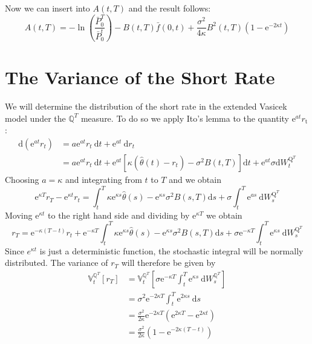 \documentclass[12pt,twoside]{reedthesis}
\begin{document}
Now we can insert into \(A(t, T)\) and the result follows:
\[
A(t, T)=-\ln \left(\frac{\bar{P}_{0}^{T}}{\bar{P}_{0}^{t}}\right)-B(t, T) \bar{f}(0, t)+\frac{\sigma^{2}}{4 \kappa} B^{2}(t, T)\left(1-\mathrm{e}^{-2 \kappa t}\right)
\]

\hypertarget{the-variance-of-the-short-rate}{%
\section{The Variance of the Short Rate}\label{the-variance-of-the-short-rate}}

We will determine the distribution of the short rate in the extended Vasicek model under the \(\mathbb{Q}^{T}\) measure. To do so we apply Ito's lemma to the quantity \(\mathrm{e}^{a t} r_{\mathrm{t}}\) :
\[
\begin{aligned}
\mathrm{d}\left(\mathrm{e}^{a t} r_{t}\right) &=a \mathrm{e}^{a t} r_{t} \mathrm{~d} t+\mathrm{e}^{a t} \mathrm{~d} r_{t} \\
&=a \mathrm{e}^{a t} r_{t} \mathrm{~d} t+\mathrm{e}^{a t}\left[\kappa\left(\hat{\theta}(t)-r_{t}\right)-\sigma^{2} B(t, T)\right] \mathrm{d} t+\mathrm{e}^{a t} \sigma \mathrm{d} W_{t}^{\mathrm{Q}^{T}}
\end{aligned}
\]
Choosing \(a=\kappa\) and integrating from \(t\) to \(T\) and we obtain
\[
\mathrm{e}^{\kappa T} r_{T}-\mathrm{e}^{\kappa t} r_{t}=\int_{t}^{T} \kappa \mathrm{e}^{\kappa s} \hat{\theta}(s)-\mathrm{e}^{\kappa s} \sigma^{2} B(s, T) \mathrm{d} s+\sigma \int_{t}^{T} \mathrm{e}^{a s} \mathrm{~d} W_{s}^{\mathrm{Q}^{T}}
\]
Moving \(\mathrm{e}^{\kappa t}\) to the right hand side and dividing by \(\mathrm{e}^{\kappa T}\) we obtain
\[
r_{T}=\mathrm{e}^{-\kappa(T-t)} r_{t}+\mathrm{e}^{-\kappa T} \int_{t}^{T} \kappa \mathrm{e}^{\kappa s} \hat{\theta}(s)-\mathrm{e}^{\kappa s} \sigma^{2} B(s, T) \mathrm{d} s+\sigma \mathrm{e}^{-\kappa T} \int_{t}^{T} \mathrm{e}^{\kappa s} \mathrm{~d} W_{s}^{\mathrm{Q}^{T}}
\]
Since \(e^{\kappa t}\) is just a deterministic function, the stochastic integral will be normally distributed. The variance of \(r_{T}\) will therefore be given by
\[
\begin{aligned}
\mathbb{V}_{t}^{\mathbb{Q}^{T}}\left[r_{T}\right] &=\mathbb{V}_{t}^{\mathbb{Q}^{T}}\left[\sigma \mathrm{e}^{-\kappa T} \int_{t}^{T} \mathrm{e}^{\kappa s} \mathrm{~d} W_{s}^{\mathbb{Q}^{T}}\right] \\
&=\sigma^{2} \mathrm{e}^{-2 \kappa T} \int_{t}^{T} \mathrm{e}^{2 \kappa s} \mathrm{~d} s \\
&=\frac{\sigma^{2}}{2 \kappa} \mathrm{e}^{-2 \kappa T}\left(\mathrm{e}^{2 \kappa T}-\mathrm{e}^{2 \kappa t}\right) \\
&=\frac{\sigma^{2}}{2 \kappa}\left(1-\mathrm{e}^{-2 \kappa(T-t)}\right)
\end{aligned}
\]
\end{document}
